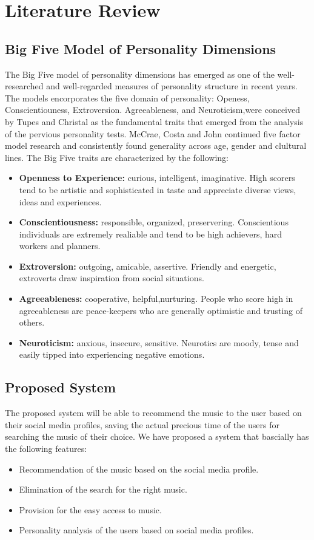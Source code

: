 \documentclass[a4paper,12pt]{article}
\begin{document}
\cleardoublepage

\section{Literature Review}
\subsection{Big Five Model of Personality Dimensions}
The Big Five model of personality dimensions has emerged as one of the well-researched and well-regarded measures of personality structure in recent years. The models encorporates the five domain of personality: Openess, Conscientiouness, Extroversion. Agreeableness, and Neuroticism,were conceived by Tupes and Christal as the fundamental traits that emerged from the analysis of the pervious personality tests. McCrae, Costa and John continued five factor model research and consistently found generality across age, gender and clultural lines. The Big Five traits are characterized by the following:
\begin{itemize}
	\item \textbf{Openness to Experience:} curious, intelligent, imaginative. High scorers tend to be artistic and sophisticated in taste and appreciate diverse views, ideas and experiences.
	\item \textbf{Conscientiousness:} responsible, organized, preservering. Conscientious individuals are extremely realiable and tend to be high achievers, hard workers and planners.
	\item \textbf{Extroversion:} outgoing, amicable, assertive. Friendly and energetic, extroverts draw inspiration from social situations.
	\item \textbf{Agreeableness:} cooperative, helpful,nurturing. People who score high in agreeableness are peace-keepers who are generally optimistic and trusting of others.
	\item \textbf{Neuroticism:} anxious, insecure, sensitive. Neurotics are moody, tense and easily tipped into experiencing negative emotions.
\end{itemize}

\subsection{Proposed System}
	The proposed system will be able to recommend the music to the user based on their social media profiles, saving the actual precious time of the users for searching the music of their choice. We have proposed a system that bascially has the following features:
\begin{itemize}
	\item Recommendation of the music based on the social media profile.
	\item Elimination of the search for the right music.
	\item Provision for the easy access to music.
	\item Personality analysis of the users based on social media profiles.
\end{itemize}
\end{document}
